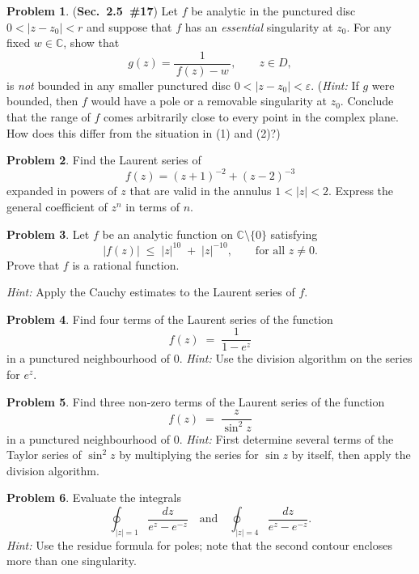 \documentclass[10pt]{article}
\theoremstyle{definition} %
\newtheorem{problem}{Problem}
\theoremstyle{plain} %
\begin{document}
\begin{problem}
  (\textbf{Sec.\ 2.5 \#17})\;
  Let \(f\) be analytic in the punctured disc \(0<\lvert z-z_{0}\rvert<r\) and suppose that \(f\) has an \emph{essential} singularity at \(z_{0}\).  
  For any fixed \(w\in\mathbb{C}\), show that
  \[
      g(z)=\frac{1}{\,f(z)-w\,},\qquad z\in D,
  \]
  is \emph{not} bounded in any smaller punctured disc \(0<\lvert z-z_{0}\rvert<\varepsilon\).  
  (\textit{Hint:} If \(g\) were bounded, then \(f\) would have a pole or a removable singularity at \(z_{0}\). Conclude that the range of \(f\) comes arbitrarily close to every point in the complex plane.  How does this differ from the situation in (1) and (2)?)
\end{problem}

\begin{problem}
  Find the Laurent series of
  \[
      f(z) = (z+1)^{-2} + (z-2)^{-3}
  \]
  expanded in powers of \(z\) that are valid in the annulus \(1<\lvert z\rvert<2\).  
  Express the general coefficient of \(z^{n}\) in terms of \(n\).
\end{problem}

\begin{problem}
  Let \(f\) be an analytic function on \(\mathbb{C}\setminus\{0\}\) satisfying
  \[
      \lvert f(z)\rvert \;\le\; \lvert z\rvert^{10} \;+\; \lvert z\rvert^{-10},
      \qquad\text{for all } z\neq0.
  \]
  Prove that \(f\) is a rational function.  

  \textit{Hint:}  Apply the Cauchy estimates to the Laurent series of \(f\).
\end{problem}
\begin{problem}
  Find four terms of the Laurent series of the function
  \[
      f(z)\;=\;\frac{1}{1-e^{z}}
  \]
  in a punctured neighbourhood of \(0\).
  \textit{Hint:} Use the division algorithm on the series for \(e^{z}\).
\end{problem}

\begin{problem}
  Find three non‑zero terms of the Laurent series of the function
  \[
      f(z)\;=\;\frac{z}{\sin^{2}z}
  \]
  in a punctured neighbourhood of \(0\).
  \textit{Hint:} First determine several terms of the Taylor series of \(\sin^{2}z\) by multiplying the series for \(\sin z\) by itself, then apply the division algorithm.
\end{problem}

\begin{problem}
  Evaluate the integrals
  \[
      \oint_{\lvert z\rvert = 1} \frac{dz}{e^{z}-e^{-z}}
      \quad\text{and}\quad
      \oint_{\lvert z\rvert = 4} \frac{dz}{e^{z}-e^{-z}}.
  \]
  \textit{Hint:} Use the residue formula for poles; note that the second contour encloses more than one singularity.
\end{problem}
\end{document}

